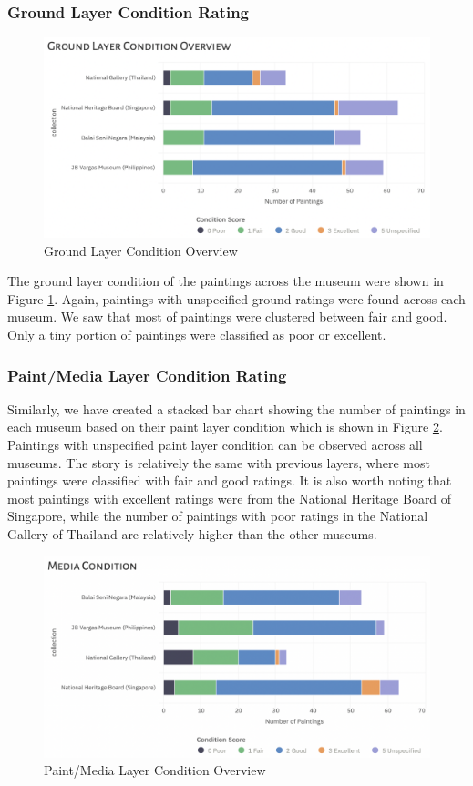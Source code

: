 \documentclass[11pt, oneside]{article}
\begin{document}
\subsubsection{Ground Layer Condition Rating}
\begin{figure}[H]
    \centering
    \includegraphics[scale=0.5]{images/ground_cond.png}
    \caption{Ground Layer Condition Overview}
    \label{ground_cond}
\end{figure}
The ground layer condition of the paintings across the museum were shown in Figure \ref{ground_cond}. Again, paintings with unspecified ground ratings were found across each museum. We saw that most of paintings were clustered between fair and good. Only a tiny portion of paintings were classified as poor or excellent.

\subsubsection{Paint/Media Layer Condition Rating}
Similarly, we have created a stacked bar chart showing the number of paintings in each museum based on their paint layer condition which is shown in Figure \ref{media_cond}. Paintings with unspecified paint layer condition can be observed across all museums. The story is relatively the same with previous layers, where most paintings were classified with fair and good ratings. It is also worth noting that most paintings with excellent ratings were from the National Heritage Board of Singapore, while the number of paintings with poor ratings in the National Gallery of Thailand are relatively higher than the other museums.
\begin{figure}[H]
    \centering
    \includegraphics[scale=0.5]{images/media_cond.png}
    \caption{Paint/Media Layer Condition Overview}
    \label{media_cond}
\end{figure}
\end{document}
